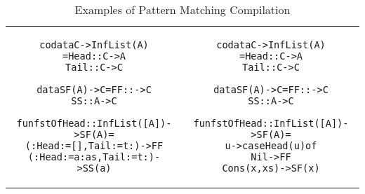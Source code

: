 \documentclass[11pt]{article}
\begin{document}
\begin{table}
\begin{center}
\begin{tabular}{|c|c|}
\begin{minipage}{3.2in}
\begin{alltt}
\end{alltt} 
\end {minipage}\\ 
\hline 
\begin{minipage}{2.6in}
\begin{alltt}

codata C -> InfList(A) 
          = Head :: C -> A 
            Tail :: C -> C

data SF(A) -> C = FF ::   -> C 
                  SS :: A -> C

fun fstOfHead::InfList([A]) -> SF(A) = 
  (: Head := []  ,Tail := t :) -> FF 
  (: Head := a:as,Tail := t :) -> SS(a)  

\end{alltt}
\end {minipage} &
\begin{minipage}{3.2in}
\begin{alltt}

codata C -> InfList(A) 
          = Head :: C -> A 
            Tail :: C -> C

data SF(A) -> C = FF ::   -> C 
                  SS :: A -> C 

fun fstOfHead :: InfList([A]) -> SF(A) =
  u -> case Head(u) of 
         Nil -> FF
         Cons(x,xs) -> SF(x) 


\end{alltt} 
\end {minipage}
\tabularnewline
\hline
\end{tabular}
\caption{Examples of Pattern Matching Compilation}
\label{Pmatch:Ex1}
\end{center}
\end{table}
\end{document}
